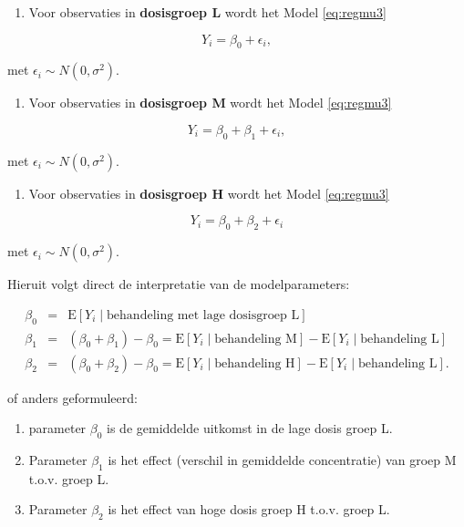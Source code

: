 \documentclass[
  12pt,dutch]{book}
\providecommand{\tightlist}{%
  \setlength{\itemsep}{0pt}\setlength{\parskip}{0pt}}
\theoremstyle{definition}
\theoremstyle{definition}
\theoremstyle{definition}
\theoremstyle{definition}
\theoremstyle{remark}
\begin{document}
\begin{enumerate}
\def\labelenumi{\arabic{enumi}.}
\tightlist
\item
  Voor observaties in \textbf{dosisgroep L} wordt het Model \eqref{eq:regmu3}
\end{enumerate}

\[Y_i = \beta_0+\epsilon_i,\]

met \(\epsilon_i \sim N(0,\sigma^2)\).

\begin{enumerate}
\def\labelenumi{\arabic{enumi}.}
\setcounter{enumi}{1}
\tightlist
\item
  Voor observaties in \textbf{dosisgroep M} wordt het Model \eqref{eq:regmu3}
\end{enumerate}

\[Y_i = \beta_0+\beta_1 + \epsilon_i,\]

met \(\epsilon_i \sim N(0,\sigma^2)\).

\begin{enumerate}
\def\labelenumi{\arabic{enumi}.}
\setcounter{enumi}{2}
\tightlist
\item
  Voor observaties in \textbf{dosisgroep H} wordt het Model \eqref{eq:regmu3}
\end{enumerate}

\[Y_i = \beta_0+\beta_2 + \epsilon_i\]

met \(\epsilon_i  \sim  N(0,\sigma^2)\).

Hieruit volgt direct de interpretatie van de modelparameters:

\begin{eqnarray*}
   \beta_0 &=&  \text{E}\left[Y_i \mid \text{behandeling met lage dosisgroep L}\right] \\
   \beta_1 &=&  (\beta_0+\beta_1)-\beta_0 = \text{E}\left[Y_i \mid \text{behandeling M}\right] - \text{E}\left[Y_i \mid \text{behandeling L}\right] \\
   \beta_2 &=&  (\beta_0+\beta_2)-\beta_0 = \text{E}\left[Y_i \mid \text{behandeling H}\right]-\text{E}\left[Y_i \mid \text{behandeling L}\right].
\end{eqnarray*}

of anders geformuleerd:

\begin{enumerate}
\def\labelenumi{\arabic{enumi}.}
\tightlist
\item
  parameter \(\beta_0\) is de gemiddelde uitkomst in de lage dosis groep L.
\item
  Parameter \(\beta_1\) is het effect (verschil in gemiddelde concentratie) van groep M t.o.v. groep L.
\item
  Parameter \(\beta_2\) is het effect van hoge dosis groep H t.o.v. groep L.
\end{enumerate}
\end{document}
